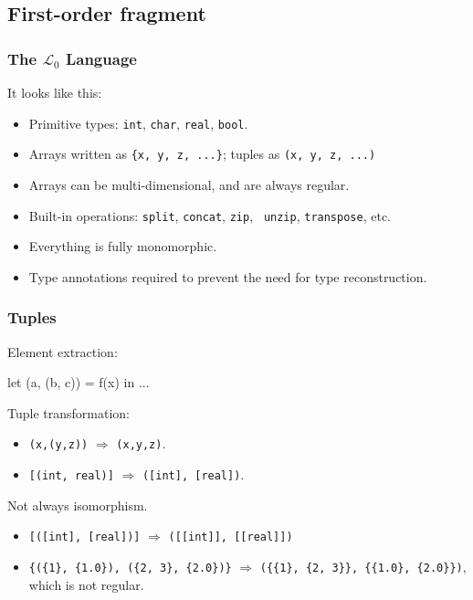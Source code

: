 \documentclass{beamer}
\newcommand{\LO}{$\mathcal{L}_0$}
\begin{document}
\subsection{First-order fragment}

\begin{frame}[fragile,t]
  \frametitle{The \LO{} Language}

It looks like this:

  \pause

  \begin{itemize}
  \item Primitive types: {\tt int}, {\tt char}, {\tt real}, {\tt bool}.
  \item Arrays written as {\tt \{x, y, z, ...\}}; tuples as {\tt (x, y,
      z, ...)}
  \item Arrays can be multi-dimensional, and are always regular.
  \item Built-in operations: {\tt split}, {\tt concat}, {\tt zip}, {\tt
      unzip}, {\tt transpose}, etc.
  \item Everything is fully monomorphic.
  \item Type annotations required to prevent the need for type
    reconstruction.
  \end{itemize}
\end{frame}

\begin{frame}[fragile,t]
  \frametitle{Tuples}

  Element extraction:

  \begin{colorcode}
    let (a, (b, c)) = f(x) in
    ...
  \end{colorcode}

  \pause

Tuple transformation:

  \begin{itemize}
  \item {\tt (x,(y,z))} $\Rightarrow$ {\tt (x,y,z)}.
  \item {\tt [(int, real)]} $\Rightarrow$ {\tt ([int], [real])}.
  \end{itemize}

\pause

Not always isomorphism.

\begin{itemize}
\item {\tt [([int], [real])]} $\Rightarrow$ {\tt([[int]], [[real]])}
\item {\tt\{(\{1\}, \{1.0\}), (\{2, 3\}, \{2.0\})\}} $\Rightarrow$
  {\tt(\{\{1\}, \{2, 3\}\}, \{\{1.0\}, \{2.0\}\})}, which is not
  regular.
\end{itemize}

\end{frame}
\end{document}

